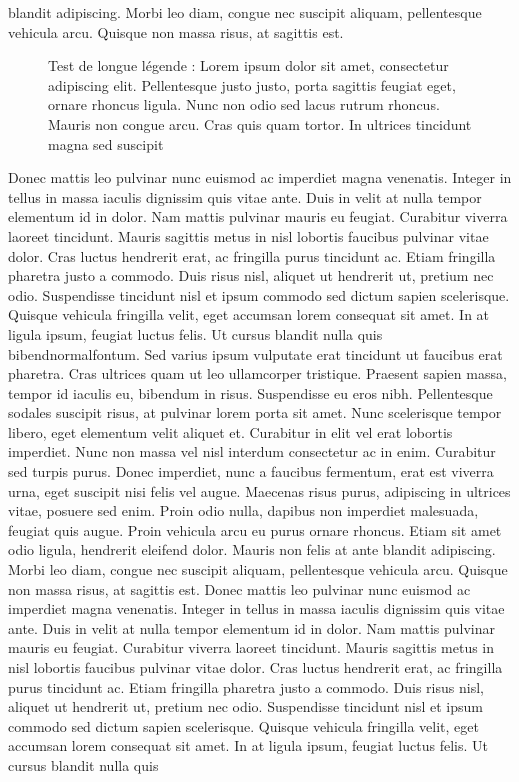 \documentclass[letterpaper, twoside, 12pt, memoire, creativecommons, hyperref]{thETS}
\begin{document}
\begin{introduction}
blandit adipiscing. Morbi leo diam, congue nec suscipit aliquam, pellentesque vehicula arcu. Quisque non massa risus, at sagittis est.
\begin{figure}[ht]
	\centering
	\caption{Test de longue légende : Lorem ipsum dolor sit amet, consectetur adipiscing elit. Pellentesque justo justo, porta sagittis feugiat eget, ornare rhoncus ligula. Nunc non odio sed lacus rutrum rhoncus. Mauris non congue arcu. Cras quis quam tortor. In ultrices tincidunt magna sed suscipit}
	\label{fig:logoets}
\end{figure}
Donec mattis leo pulvinar nunc euismod ac imperdiet magna venenatis. Integer in tellus in massa iaculis dignissim quis vitae ante. Duis in velit at nulla tempor elementum id in dolor. Nam mattis pulvinar mauris eu feugiat. Curabitur viverra laoreet tincidunt. Mauris sagittis metus in nisl lobortis faucibus pulvinar vitae dolor. Cras luctus hendrerit erat, ac fringilla purus tincidunt ac. Etiam fringilla pharetra justo a commodo. Duis risus nisl, aliquet ut hendrerit ut, pretium nec odio. Suspendisse tincidunt nisl et ipsum commodo sed dictum sapien scelerisque. Quisque vehicula fringilla velit, eget accumsan lorem consequat sit amet. In at ligula ipsum, feugiat luctus felis. Ut cursus blandit nulla quis bibendnormalfontum. Sed varius ipsum vulputate erat tincidunt ut faucibus erat pharetra. Cras ultrices quam ut leo ullamcorper tristique. Praesent sapien massa, tempor id iaculis eu, bibendum in risus. Suspendisse eu eros nibh. Pellentesque sodales suscipit risus, at pulvinar lorem porta sit amet. Nunc scelerisque tempor libero, eget elementum velit aliquet et. Curabitur in elit vel erat lobortis imperdiet. Nunc non massa vel nisl interdum consectetur ac in enim. Curabitur sed turpis purus. Donec imperdiet, nunc a faucibus fermentum, erat est viverra urna, eget suscipit nisi felis vel augue. Maecenas risus purus, adipiscing in ultrices vitae, posuere sed enim. Proin odio nulla, dapibus non imperdiet malesuada, feugiat quis augue. Proin vehicula arcu eu purus ornare rhoncus. Etiam sit amet odio ligula, hendrerit eleifend dolor. Mauris non felis at ante blandit adipiscing. Morbi leo diam, congue nec suscipit aliquam, pellentesque vehicula arcu. Quisque non massa risus, at sagittis est. Donec mattis leo pulvinar nunc euismod ac imperdiet magna venenatis. Integer in tellus in massa iaculis dignissim quis vitae ante. Duis in velit at nulla tempor elementum id in dolor. Nam mattis pulvinar mauris eu feugiat. Curabitur viverra laoreet tincidunt. Mauris sagittis metus in nisl lobortis faucibus pulvinar vitae dolor. Cras luctus hendrerit erat, ac fringilla purus tincidunt ac. Etiam fringilla pharetra justo a commodo. Duis risus nisl, aliquet ut hendrerit ut, pretium nec odio. Suspendisse tincidunt nisl et ipsum commodo sed dictum sapien scelerisque. Quisque vehicula fringilla velit, eget accumsan lorem consequat sit amet. In at ligula ipsum, feugiat luctus felis. Ut cursus blandit nulla quis 
\end{introduction}
\end{document}
